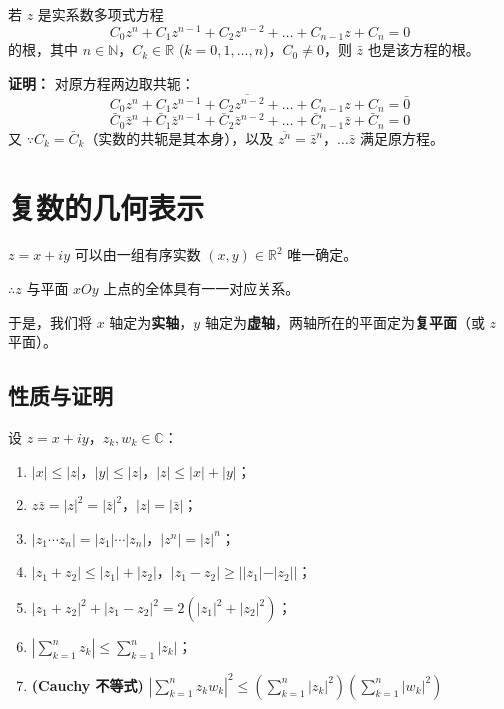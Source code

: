 \begin{tcolorbox}[title=定理：共轭虚根定理, colframe=blue!50!black, colback=blue!5!white]
	若 $z$ 是实系数多项式方程
	$$C_0 z^n + C_1 z^{n-1} + C_2 z^{n-2} + \dots + C_{n-1} z + C_n = 0$$
	的根，其中 $n \in \mathbb{N}$，$C_k \in \mathbb{R}$ ($k=0, 1, \dots, n$)，$C_0 \neq 0$，则 $\bar{z}$ 也是该方程的根。
	
	\tcbline %
	
	\textbf{证明：}
	对原方程两边取共轭：
	$$\overline{C_0 z^n + C_1 z^{n-1} + C_2 z^{n-2} + \dots + C_{n-1} z + C_n} = \bar{0}$$
	$$\bar{C}_0 \bar{z}^n + \bar{C}_1 \bar{z}^{n-1} + \bar{C}_2 \bar{z}^{n-2} + \dots + \bar{C}_{n-1} \bar{z} + \bar{C}_n = 0$$
	又 $\because C_k = \bar{C}_k$（实数的共轭是其本身），以及 $\overline{z^n} = \bar{z}^n$，$\dots \bar{z}$ 满足原方程。
\end{tcolorbox}

\section{复数的几何表示}
$z = x + iy$ 可以由一组有序实数 $(x, y) \in \mathbb{R}^2$ 唯一确定。

$\therefore z$ 与平面 $xOy$ 上点的全体具有一一对应关系。

于是，我们将 $x$ 轴定为\textbf{实轴}，$y$ 轴定为\textbf{虚轴}，两轴所在的平面定为\textbf{复平面}（或 $z$ 平面）。

\subsection{性质与证明}
\begin{tcolorbox}[title=复数的模与不等式性质, colframe=green!45!black, colback=green!5!white]
	设 $z = x + iy$，$z_k, w_k \in \mathbb{C}$：
	\begin{enumerate}
		\item $|x| \le |z|$，$|y| \le |z|$，$|z| \le |x| + |y|$；
		\item $z\bar{z} = |z|^2 = |\bar{z}|^2$，$|z| = |\bar{z}|$；
		\item $|z_1 \cdots z_n| = |z_1| \cdots |z_n|$，$|z^n| = |z|^n$；
		\item $|z_1 + z_2| \le |z_1| + |z_2|$，$|z_1 - z_2| \ge ||z_1| - |z_2||$；
		\item $|z_1 + z_2|^2 + |z_1 - z_2|^2 = 2(|z_1|^2 + |z_2|^2)$；
		\item $\left|\sum_{k=1}^n z_k\right| \le \sum_{k=1}^n |z_k|$；
		\item \textbf{(Cauchy 不等式)} $\left|\sum_{k=1}^n z_k w_k\right|^2 \le \left(\sum_{k=1}^n |z_k|^2\right)\left(\sum_{k=1}^n |w_k|^2\right)$
	\end{enumerate}
\end{tcolorbox}

